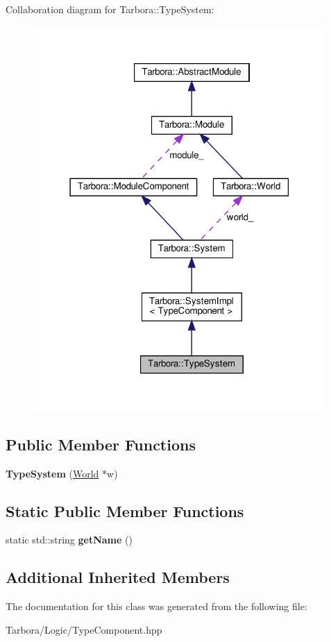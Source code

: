Collaboration diagram for Tarbora\+:\+:Type\+System\+:\nopagebreak
\begin{figure}[H]
\begin{center}
\leavevmode
\includegraphics[width=316pt]{classTarbora_1_1TypeSystem__coll__graph}
\end{center}
\end{figure}
\subsection*{Public Member Functions}
\begin{DoxyCompactItemize}
\item 
\mbox{\label{classTarbora_1_1TypeSystem_aa3cb6ff5e3c3f1e7dacd63618f5a7c7f}} 
{\bfseries Type\+System} (\hyperlink{classTarbora_1_1World}{World} $\ast$w)
\end{DoxyCompactItemize}
\subsection*{Static Public Member Functions}
\begin{DoxyCompactItemize}
\item 
\mbox{\label{classTarbora_1_1TypeSystem_a30fa8ae0e76471af4fc510468a12fb71}} 
static std\+::string {\bfseries get\+Name} ()
\end{DoxyCompactItemize}
\subsection*{Additional Inherited Members}


The documentation for this class was generated from the following file\+:\begin{DoxyCompactItemize}
\item 
Tarbora/\+Logic/Type\+Component.\+hpp\end{DoxyCompactItemize}

